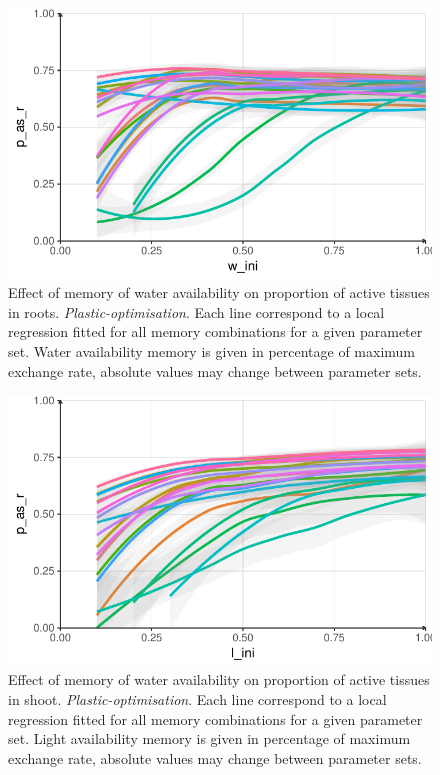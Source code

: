 \begin{figure}\label{fig:w_ini_p_as_r}
\includegraphics[width = \textwidth]{./2_PP/Figures/Individual/w_ini_p_as_r.pdf}
\caption{Effect of memory of water availability on proportion of active tissues in roots. \textit{Plastic-optimisation}. Each line correspond to a local regression fitted for all memory combinations for a given parameter set. Water availability memory is given in percentage of maximum exchange rate, absolute values may change between parameter sets.}
\end{figure}


\begin{figure}\label{fig:l_ini_p_as_r}
\includegraphics[width = \textwidth]{./2_PP/Figures/Individual/l_ini_p_as_r.pdf}
\caption{Effect of memory of water availability on proportion of active tissues in shoot. \textit{Plastic-optimisation}. Each line correspond to a local regression fitted for all memory combinations for a given parameter set. Light availability memory is given in percentage of maximum exchange rate, absolute values may change between parameter sets.}
\end{figure}

